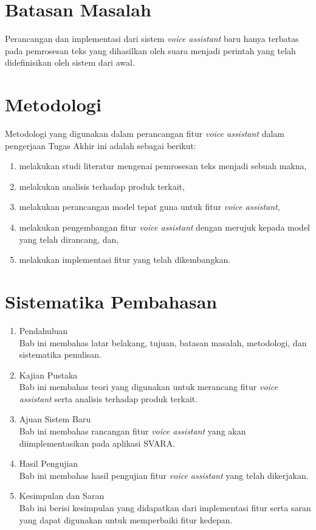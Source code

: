 \section{Batasan Masalah}

Perancangan dan implementasi dari sistem \textit{voice assistant} baru hanya terbatas pada pemrosesan teks yang dihasilkan oleh suara menjadi perintah yang telah didefinisikan oleh sistem dari awal.

\section{Metodologi}

Metodologi yang digunakan dalam perancangan fitur \textit{voice assistant} dalam pengerjaan Tugas Akhir ini adalah sebagai berikut:

\begin{enumerate}
	\item melakukan studi literatur mengenai pemrosesan teks menjadi sebuah makna,
	\item melakukan analisis terhadap produk terkait,
	\item melakukan perancangan model tepat guna untuk fitur \textit{voice assistant},
	\item melakukan pengembangan fitur \textit{voice assistant} dengan merujuk kepada model yang telah dirancang, dan,
	\item melakukan implementasi fitur yang telah dikembangkan. 
\end{enumerate}

\section{Sistematika Pembahasan}

\begin{enumerate}[label=Bab \arabic*,itemindent=*]
	\item Pendahuluan\\
	Bab ini membahas latar belakang, tujuan, batasan masalah, metodologi, dan sistematika penulisan.
	\item Kajian Pustaka\\
	Bab ini membahas teori yang digunakan untuk merancang fitur \textit{voice assistant} serta analisis terhadap produk terkait.
	\item Ajuan Sistem Baru\\
	Bab ini membahas rancangan fitur \textit{voice assistant} yang akan diimplementasikan pada aplikasi SVARA.
	\item Hasil Pengujian\\
	Bab ini membahas hasil pengujian fitur \textit{voice assistant} yang telah dikerjakan.
	\item Kesimpulan dan Saran\\
	Bab ini berisi kesimpulan yang didapatkan dari implementasi fitur serta saran yang dapat digunakan untuk memperbaiki fitur kedepan.
\end{enumerate}
